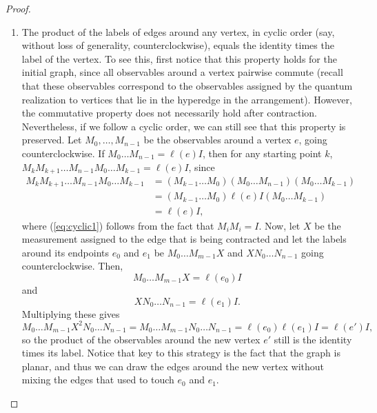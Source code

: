 \documentclass{llncs}
\begin{document}
\begin{proof}
\begin{enumerate}
  \item The product of the labels of edges around any vertex, in
    cyclic order (say, without loss of generality, counterclockwise),
    equals the identity times the label of the vertex. To see this,
    first notice that this property holds for the initial graph, since
    all observables around a vertex pairwise commute (recall that
    these observables correspond to the observables assigned by the
    quantum realization to vertices that lie in the hyperedge in the
    arrangement). However, the commutative property does not
    necessarily hold after contraction. Nevertheless, if we follow a
    cyclic order, we can still see that this property is
    preserved. Let \(M_{0}, \ldots, M_{n-1}\) be the observables
    around a vertex \(e\), going counterclockwise. If
    \(M_{0} \ldots M_{n - 1} = \ell(e) I\), then for any starting
    point \(k\),
    \(M_{k} M_{k+1}\ldots M_{n-1}M_{0}\ldots M_{k-1} = \ell(e) I\),
    since
    \begin{align}
      M_{k}M_{k+1} \ldots M_{n-1}M_{0}\ldots M_{k-1}
      &= (M_{k-1}\ldots M_{0})(M_{0} \ldots M_{n-1})(M_{0}\ldots M_{k-1})  \label{eq:cyclic1} \\
      &= (M_{k-1}\ldots M_{0})\ell(e) I(M_{0}\ldots M_{k-1}) \\
      &= \ell(e) I,  \label{eq:cyclic2}
    \end{align}
    where (\ref{eq:cyclic1}) follows from the fact that
    \(M_{i} M_{i} = I\). Now, let \(X\) be the measurement assigned to
    the edge that is being contracted and let the labels around its
    endpoints \(e_{0}\) and \(e_{1}\) be \(M_{0}\ldots M_{m-1}X\) and
    \(X N_{0}\ldots N_{n-1}\) going counterclockwise. Then,
    \[
      M_{0} \ldots M_{m-1} X = \ell(e_{0})I
    \]
    and
    \[
      X N_{0} \ldots N_{n-1} = \ell(e_{1})I.
    \]
    Multiplying these gives
    \[
      M_{0}\ldots M_{m-1} X^{2} N_{0} \ldots N_{n-1} =
      M_{0}\ldots M_{m-1} N_{0} \ldots N_{n-1} =
      \ell(e_{0}) \ell(e_{1}) I = \ell(e') I,
    \]
    so the product of the observables around the new vertex \(e'\)
    still is the identity times its label. Notice that key to this
    strategy is the fact that the graph is planar, and thus we can
    draw the edges around the new vertex without mixing the edges that
    used to touch \(e_{0}\) and \(e_{1}\).
  \end{enumerate}


\end{proof}
\end{document}
